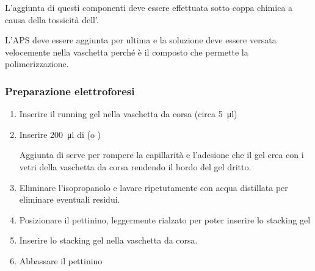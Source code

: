 \begin{Attenzione}
	L'aggiunta di questi componenti deve essere effettuata sotto coppa chimica a causa della tossicità dell'.
\end{Attenzione}

\begin{Note}
	L'APS deve essere aggiunta per ultima e la soluzione deve essere versata velocemente nella vaschetta perché è il composto che permette la polimerizzazione.
\end{Note}

\subsubsection{Preparazione elettroforesi}
\begin{enumerate}
	\item Inserire il running gel nella vaschetta da corsa (circa \qty{5}{\micro\litre})
	\item Inserire \qty{200}{\micro\litre} di  (o )
	      \begin{Note}
		      Aggiunta di  serve per rompere la capillarità e l'adesione che il gel crea con i vetri della vaschetta da corsa rendendo il bordo del gel dritto.
	      \end{Note}
	\item Eliminare l’isopropanolo e lavare ripetutamente con acqua distillata per eliminare eventuali residui.
	\item Posizionare il pettinino, leggermente rialzato per poter inserire lo stacking gel
	\item Inserire lo stacking gel nella vaschetta da corsa.
	\item Abbassare il pettinino
\end{enumerate}

